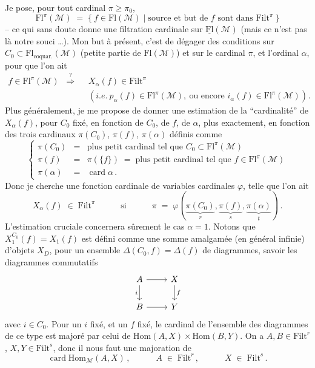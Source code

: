 \documentclass[11pt]{article}
\newcommand{\printedpage}[1]{\marginpar{\footnotesize p.~#1}}
\newcommand{\msp}[1]{\marginpar{\footnotesize [#1]}}
\newcommand{\uFl}{\underline{\mathrm{Fl}}}
\newcommand{\Fl}{\mathrm{Fl}}
\newcommand{\Filt}{\mathrm{Filt}}
\newcommand{\cM}{\mathcal{M}}
\newcommand{\card}{\operatorname{card}}
\begin{document}
Je pose, pour tout cardinal $\pi\geq\pi_0$,
\[
\Fl^\pi(\cM) \;=\; \{\ f\in\Fl(\cM) \mid \text{source et but de $f$ sont dans } \Filt^\pi\ \}
\tag*{(3.3)}
\]
-- ce qui sans doute donne une filtration cardinale sur $\uFl(\cM)$ (mais ce n'est pas là notre souci \ldots). Mon but à présent, c'est de dégager des conditions sur $C_0\subset\Fl_{\text{coquar.}}(\cM)$ (petite partie de $\Fl(\cM)$) et sur le cardinal $\pi$, et l'ordinal $\alpha$, pour que l'on ait
\[
\begin{aligned}
f\in\Fl^\pi(\cM) \;\;\overset{?}{\Longrightarrow}\;\; & X_\alpha(f)\in\Filt^\pi \\
& (\textit{i.e.}\ p_\alpha(f)\in\Fl^\pi(\cM),\ \text{ou encore } i_\alpha(f)\in\Fl^\pi(\cM))\,.
\end{aligned}
\tag*{(3.4)}
\]
Plus généralement, je me propose de donner une estimation de la ``cardinalité'' de $X_\alpha(f)$, pour $C_0$ fixé, en fonction de $C_0$, de $f$, de $\alpha$, plus exactement, en fonction des trois cardinaux $\pi(C_0)$, $\pi(f)$, $\pi(\alpha)$ définis comme
\[
\left\{
\begin{array}{rcl}
\pi(C_0) & = & \text{plus petit cardinal tel que } C_0\subset\Fl^\pi(\cM) \\[1ex]
\pi(f) & = & \pi(\{f\}) \;=\; \text{plus petit cardinal tel que } f\in\Fl^\pi(\cM) \\[1ex]
\pi(\alpha) & = & \card\alpha\,.
\end{array}
\right.
\tag*{(3.5)}
\]
Donc je cherche une fonction
\msp{page 18}
cardinale de variables cardinales $\varphi$, telle que l'on ait
\[
X_\alpha(f) \;\in\; \Filt^\pi \qquad\quad \text{si} \qquad\quad \pi \;=\; \varphi(\underbrace{\pi(C_0)}_{r},\underbrace{\pi(f)}_{s},\underbrace{\pi(\alpha)}_{t})\,.
\tag*{(3.6)}
\]
L'estimation cruciale concernera sûrement le cas $\alpha=1$. Notons que $X_1^{C_0}(f)=X_1(f)$ est défini comme une somme amalgamée (en général infinie) d'objets $X_D$, pour un ensemble $\Delta(C_0,f)=\Delta(f)$ de diagrammes, savoir les diagrammes commutatifs
\[
\begin{tikzcd}
A \arrow[r] \arrow[d, "i"'] & X \arrow[d, "f"] \\
B \arrow[r] & Y
\end{tikzcd}
\]
\printedpage{13}
avec $i\in C_0$. Pour un $i$ fixé, et un $f$ fixé, le cardinal de l'ensemble des diagrammes de ce type est majoré par celui de $\mathrm{Hom}(A,X)\times\mathrm{Hom}(B,Y)$. On a $A,B\in\Filt^r$, $X,Y\in\Filt^s$, donc il nous faut une majoration de
\[
\card\mathrm{Hom}_{\cM}(A,X)\,, \qquad\quad A\;\in\;\Filt^r\,, \qquad\quad X\;\in\;\Filt^s\,.
\]
\end{document}
